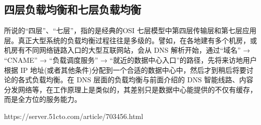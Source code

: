 \documentclass[../../../interview-questions.tex]{subfiles}
\begin{document}
\subsection{四层负载均衡和七层负载均衡}

所说的“四层”、“七层”，指的是经典的OSI 七层模型中第四层传输层和第七层应用层。真正大型系统的负载均衡过程往往是多级的。譬如，在各地建有多个机房，或机房有不同网络链路入口的大型互联网站，会从 DNS 解析开始，通过“域名” → “CNAME” → “负载调度服务” → “就近的数据中心入口”的路径，先将来访地用户根据 IP 地址(或者其他条件)分配到一个合适的数据中心中，然后才到稍后将要讨论的各式负载均衡。在 DNS 层面的负载均衡与前面介绍的 DNS 智能线路、内容分发网络等，在工作原理上是类似的，其差别只是数据中心能提供的不仅有缓存，而是全方位的服务能力。

https://server.51cto.com/article/703456.html
\end{document}

